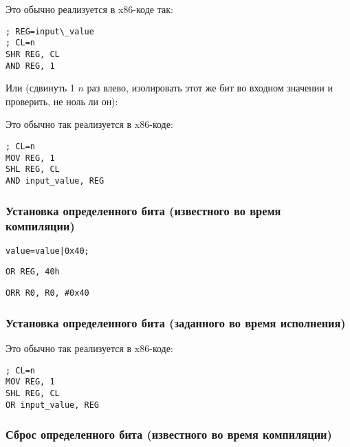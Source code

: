 Это обычно реализуется в x86-коде так:

\begin{lstlisting}[caption=x86,style=customasmx86]
; REG=input\_value
; CL=n
SHR REG, CL
AND REG, 1
\end{lstlisting}

Или (сдвинуть 1 $n$ раз влево, изолировать этот же бит во входном значении и проверить, не ноль ли он):



Это обычно так реализуется в x86-коде:

\begin{lstlisting}[caption=x86,style=customasmx86]
; CL=n
MOV REG, 1
SHL REG, CL
AND input_value, REG
\end{lstlisting}

\subsubsection{Установка определенного бита (известного во время компиляции)}

\begin{lstlisting}[caption=\CCpp,style=customc]
value=value|0x40;
\end{lstlisting}

\begin{lstlisting}[caption=x86,style=customasmx86]
OR REG, 40h
\end{lstlisting}

\begin{lstlisting}[caption=ARM (\ARMMode) и ARM64,style=customasmARM]
ORR R0, R0, #0x40
\end{lstlisting}

\subsubsection{Установка определенного бита (заданного во время исполнения)}



Это обычно так реализуется в x86-коде:

\begin{lstlisting}[caption=x86,style=customasmx86]
; CL=n
MOV REG, 1
SHL REG, CL
OR input_value, REG
\end{lstlisting}

\subsubsection{Сброс определенного бита (известного во время компиляции)}

